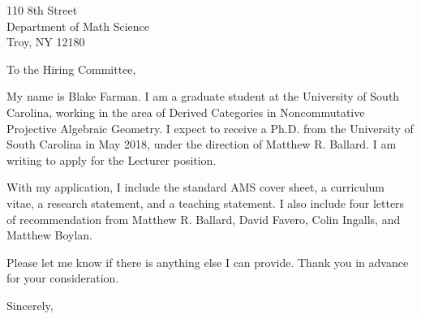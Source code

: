 \documentclass[12pt]{letter}
\date{\today}
\def\MSPRF{As requested in the posting, I have applied for an NSF Mathematical Sciences Postdoctoral Fellowship.
  If awarded, I plan to use it to carry out the proposed research laid out in my research statement at the University of Glasgow under the direction of Michael Wemyss.}
\def\position{Lecturer position}
\def\materials{the standard AMS cover sheet,
  a curriculum vitae,
  a research statement,
  and a teaching statement}
\def\contacts{Paul Hacking}
\def\numresrefs{three}
\def\numteachrefs{one}
\def\refs{Matthew R. Ballard, David Favero, and Colin Ingalls}
\def\teachingrefs{Matthew Boylan}
\begin{document}
\begin{letter}{
    110 8th Street\\
    Department of Math Science\\
    Troy, NY 12180
  }
  \opening{To the Hiring Committee,}

  My name is Blake Farman.
  I am a graduate student at the University of South Carolina, working in the area of Derived Categories in Noncommutative Projective Algebraic Geometry.
  I expect to receive a Ph.D. from the University of South Carolina in May 2018, under the direction of Matthew R. Ballard.
  I am writing to apply for the \position.

  With my application, I include \materials.
  I also include four letters of recommendation from Matthew R. Ballard, David Favero, Colin Ingalls, and Matthew Boylan.

  
  Please let me know if there is anything else I can provide.
  Thank you in advance for your consideration.
  \closing{Sincerely,}

\end{letter}
\end{document}
